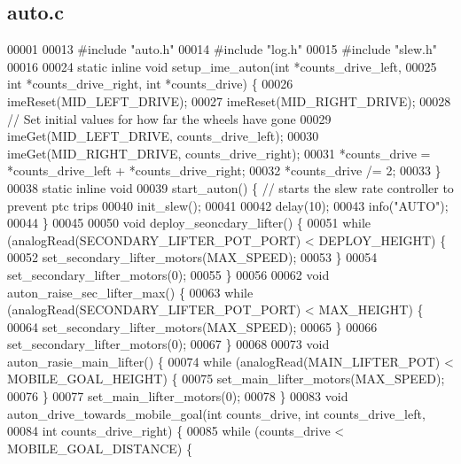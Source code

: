 \subsection{auto.\+c}
\label{auto_8c_source}

\begin{DoxyCode}
00001 
00013 \textcolor{preprocessor}{#include "auto.h"}
00014 \textcolor{preprocessor}{#include "log.h"}
00015 \textcolor{preprocessor}{#include "slew.h"}
00016 
00024 \textcolor{keyword}{static} \textcolor{keyword}{inline} \textcolor{keywordtype}{void} setup_ime_auton(\textcolor{keywordtype}{int} *counts\_drive\_left,
00025                                    \textcolor{keywordtype}{int} *counts\_drive\_right, \textcolor{keywordtype}{int} *counts\_drive) \{
00026   imeReset(MID\_LEFT\_DRIVE);
00027   imeReset(MID\_RIGHT\_DRIVE);
00028   \textcolor{comment}{// Set initial values for how far the wheels have gone}
00029   imeGet(MID\_LEFT\_DRIVE, counts\_drive\_left);
00030   imeGet(MID\_RIGHT\_DRIVE, counts\_drive\_right);
00031   *counts\_drive = *counts\_drive\_left + *counts\_drive\_right;
00032   *counts\_drive /= 2;
00033 \}
00038 \textcolor{keyword}{static} \textcolor{keyword}{inline} \textcolor{keywordtype}{void}
00039 start_auton() \{ \textcolor{comment}{// starts the slew rate controller to prevent ptc trips}
00040   init_slew();
00041 
00042   delay(10);
00043   info(\textcolor{stringliteral}{"AUTO"});
00044 \}
00045 
00050 \textcolor{keywordtype}{void} deploy_seoncdary_lifter() \{
00051   \textcolor{keywordflow}{while} (analogRead(SECONDARY\_LIFTER\_POT\_PORT) < DEPLOY\_HEIGHT) \{
00052     set_secondary_lifter_motors(MAX\_SPEED);
00053   \}
00054   set_secondary_lifter_motors(0);
00055 \}
00056 
00062 \textcolor{keywordtype}{void} auton_raise_sec_lifter_max() \{
00063   \textcolor{keywordflow}{while} (analogRead(SECONDARY\_LIFTER\_POT\_PORT) < MAX\_HEIGHT) \{
00064     set_secondary_lifter_motors(MAX\_SPEED);
00065   \}
00066   set_secondary_lifter_motors(0);
00067 \}
00068 
00073 \textcolor{keywordtype}{void} auton_rasie_main_lifter() \{
00074   \textcolor{keywordflow}{while} (analogRead(MAIN\_LIFTER\_POT) < MOBILE\_GOAL\_HEIGHT) \{
00075     set_main_lifter_motors(MAX\_SPEED);
00076   \}
00077   set_main_lifter_motors(0);
00078 \}
00083 \textcolor{keywordtype}{void} auton_drive_towards_mobile_goal(\textcolor{keywordtype}{int} counts\_drive, \textcolor{keywordtype}{int} counts\_drive\_left,
00084                                      \textcolor{keywordtype}{int} counts\_drive\_right) \{
00085   \textcolor{keywordflow}{while} (counts\_drive < MOBILE\_GOAL\_DISTANCE) \{

\end{DoxyCode}
